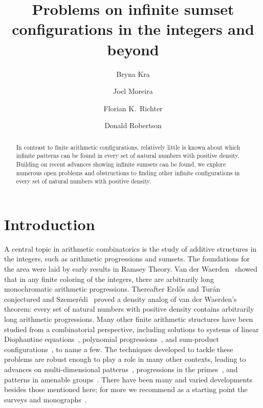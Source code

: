 \documentclass[10pt,dvipsnames]{article}
\theoremstyle{definition}
\theoremstyle{plain}
\newcommand{\Erdos}{Erd\H{o}s}
\newcommand{\Szemeredi}{Szemer\'{e}di}
\newcommand{\Turan}{Tur{\'a}n}
\begin{document}
\author{Bryna Kra\and Joel Moreira\and Florian K.~Richter\and Donald Robertson}

\title{\textbf{Problems on infinite sumset configurations in the integers and beyond}}
\maketitle

\begin{abstract}
In contrast to finite arithmetic configurations, relatively little is known about which infinite patterns can be found in every set of natural numbers with positive density. 
Building on recent advances showing infinite sumsets can be found, we explore numerous open problems and obstructions to finding other infinite configurations 
in every set of natural numbers with positive density. 
\end{abstract}
{
\renewcommand{\baselinestretch}{0}
\tableofcontents
\renewcommand{\baselinestretch}{1.0}
}

\section{Introduction}


A central topic in arithmetic combinatorics is the study of additive structures in the integers, such as arithmetic progressions and sumsets. The foundations for the area were laid by early results in Ramsey Theory.
Van der Waerden~\cite{VDW} showed that in any finite coloring of the integers, there are arbitrarily long monochromatic arithmetic progressions. 
Thereafter \Erdos{} and \Turan{}~\cite{ET36} conjectured and
\Szemeredi{}~\cite{S} proved a density analog of van der Waerden's theorem:  every set of natural numbers with positive density contains arbitrarily long arithmetic progressions.
Many other finite arithmetic structures have been studied from a combinatorial perspective, including solutions to systems of linear Diophantine equations~\cite{Rado33, Schur16}, polynomial progressions~\cite{bergelson-leibman}, and sum-product configurations~\cite{Moreira}, to name a few.
The techniques developed to tackle these problems are robust enough to play a role in many other contexts, leading to advances on multi-dimensional patterns~\cite{Furstenberg-Katznelson}, progressions in the primes~\cite{Green_Tao08, Green_Tao10},  and patterns in amenable groups~\cite{austin2016}.
There have been many and varied developments besides those mentioned here; for more we recommend as a starting point the surveys and monographs~\cite{Bergelson96,conlon-fox-zhao,f-problems,Furstenberg-book,Graham_Rothschild_Spencer80,HK-book}.
\end{document}
